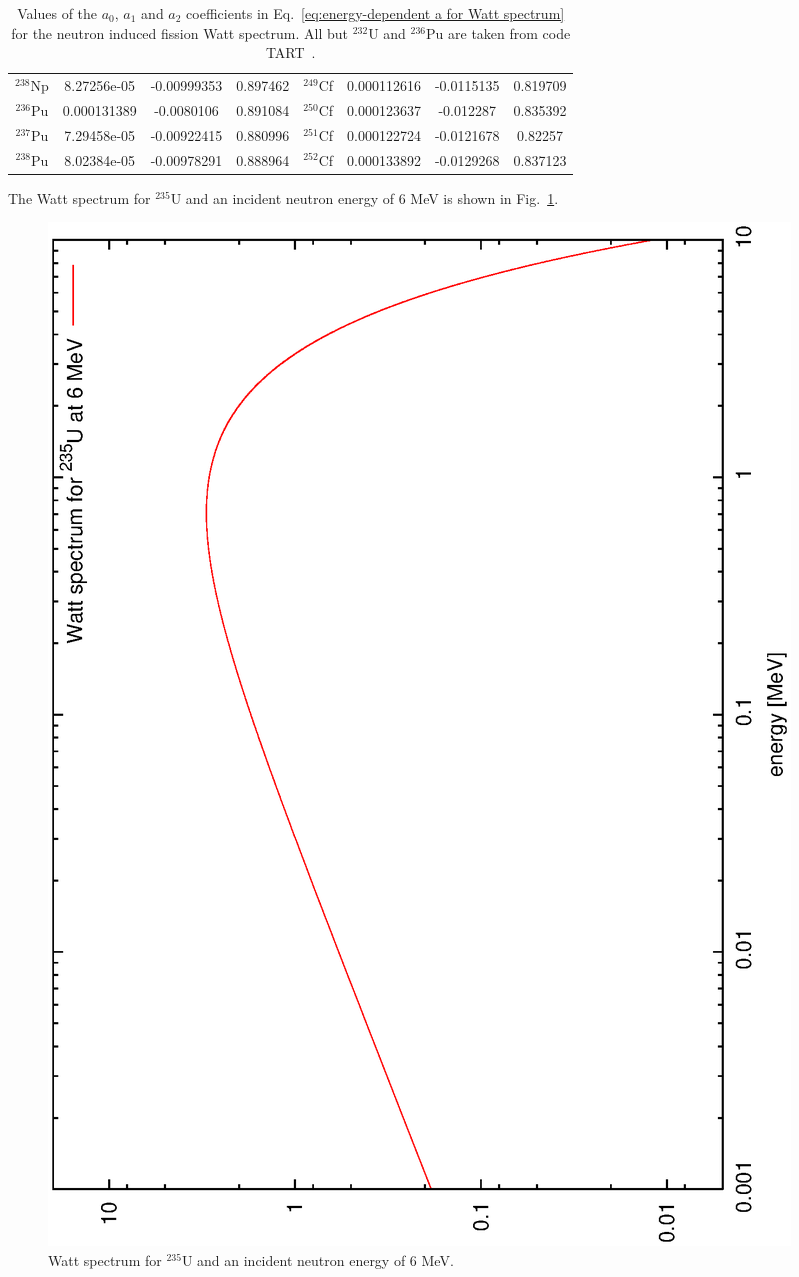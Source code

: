 \begin{table}[ht]
\begin{center}
\begin{tabular}{|c|c|c|c||c|c|c|c|}
$^{238}$Np & 8.27256e-05 & -0.00999353 & 0.897462 & $^{249}$Cf & 0.000112616 & -0.0115135 & 0.819709 \\
$^{236}$Pu & 0.000131389 & -0.0080106 & 0.891084 & $^{250}$Cf & 0.000123637 & -0.012287 & 0.835392 \\
$^{237}$Pu & 7.29458e-05 & -0.00922415 & 0.880996 & $^{251}$Cf & 0.000122724 & -0.0121678 & 0.82257 \\
$^{238}$Pu & 8.02384e-05 & -0.00978291 & 0.888964 & $^{252}$Cf & 0.000133892 & -0.0129268 & 0.837123 \\ \hline
\end{tabular}
\end{center}
\caption{Values of the $a_0$, $a_1$ and $a_2$ coefficients in 
Eq.~\ref{eq:energy-dependent a for Watt spectrum} for the neutron 
induced fission Watt spectrum. All but $^{232}$U and $^{236}$Pu are 
taken from code TART~\cite{TART 2003, Cullen 2004}.}
\label{table:nubar for induced fission}
\end{table}


The Watt spectrum for $^{235}$U and an incident neutron energy 
of 6 MeV is shown in Fig.~\ref{Watt spectrum for U235}.
%
\begin{figure}[ht]
\begin{center}
\includegraphics[scale=0.4, angle=-90]{eps/Wattspectrum_U235_6MeV.eps}
\end{center}
\caption{Watt spectrum for $^{235}$U and an incident neutron energy of 6 MeV.}
\label{Watt spectrum for U235}
\end{figure}

